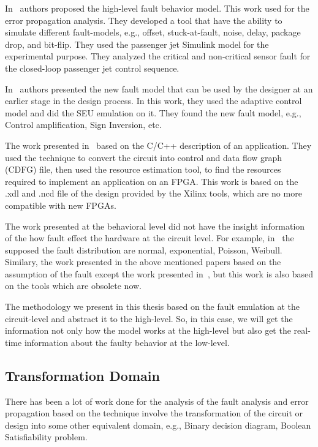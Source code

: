 In~\citep{janschek2017errorsim} authors proposed the high-level fault behavior model. This work  used for the error propagation analysis. They developed a tool that have the ability to simulate different fault-models, e.g., offset, stuck-at-fault, noise, delay, package drop, and bit-flip. They used the passenger jet Simulink model for the experimental purpose. They analyzed the critical and non-critical sensor fault for the closed-loop passenger jet control sequence.

In~\citep{hobeika2013flight} authors presented the new fault model that can be used by the designer at an earlier stage in the design process. In this work, they used the adaptive control model and did the SEU emulation on it. They found the new fault model, e.g., Control amplification, Sign Inversion, etc.

The work presented in~\citep{thibeault2013library} based on the C/C++ description of an application. They used the technique to convert the circuit into control and data flow graph (CDFG) file, then used the resource estimation tool, to find the resources required to implement an application on an FPGA. This work is based on the .xdl and .ncd file of the design provided by the Xilinx tools, which are no more compatible with new FPGAs.


The work presented at the behavioral level did not have the insight information of the how fault effect the hardware at the circuit level. For example, in~\citep{janschek2017errorsim} the supposed the fault distribution are normal, exponential, Poisson, Weibull. Similary, the work presented in the above mentioned papers based on the assumption of the fault except the work presented in~\citep{hobeika2013flight}, but this work is also based on the tools which are obsolete now.


The methodology we present in this thesis based on the fault emulation at the circuit-level and abstract it to the high-level. So, in this case, we will get the information not only how the model works at the high-level but also get the real-time information about the faulty behavior at the low-level.


\subsection{Transformation Domain}



There has been a lot of work done for the analysis of the fault analysis and error propagation based on the technique involve the transformation of the circuit or design into some other equivalent domain, e.g., Binary decision diagram, Boolean Satisfiability problem.

